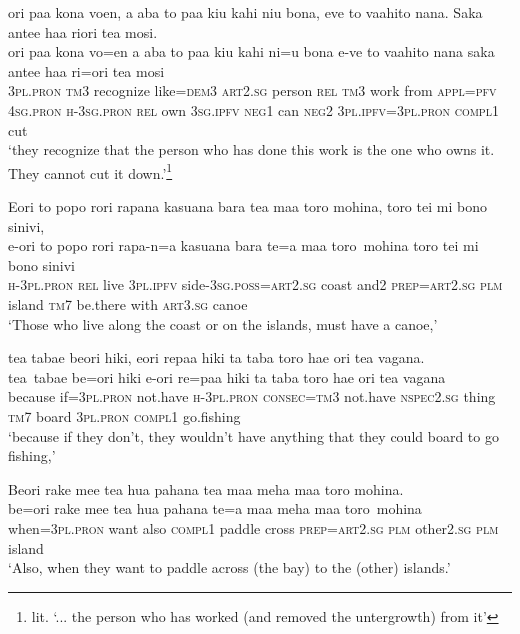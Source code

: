 \ea\label{ex:text3-10}
ori paa kona voen, a aba to paa kiu kahi niu bona, eve to vaahito nana. Saka antee haa riori tea mosi.\\
\gll ori	paa	kona	vo=en	a	aba	to	paa	kiu	kahi	ni=u	bona	e-ve	to	vaahito	nana	saka	antee	haa	ri=ori	tea	mosi\\
     3\textsc{pl}.\textsc{pron}	\textsc{tm}3	recognize	like=\textsc{dem}3	\textsc{art}2.\textsc{sg}	person	\textsc{rel}	\textsc{tm}3	work	from	\textsc{appl}=\textsc{pfv}	4\textsc{sg}.\textsc{pron}	\textsc{h}-3\textsc{sg}.\textsc{pron}	\textsc{rel}	own	3\textsc{sg}.\textsc{ipfv}	\textsc{neg}1	can	\textsc{neg}2	3\textsc{pl}.\textsc{ipfv}=3\textsc{pl}.\textsc{pron}	\textsc{compl}1	cut\\
\glt `they recognize that the person who has done this work is the one who owns it. They cannot cut it down.'\footnote{lit. `... the person who has worked  (and removed the untergrowth) from it'}
\z

\ea\label{ex:text3-11}
Eori to popo rori rapana kasuana bara tea maa toro mohina, toro tei mi bono sinivi,\\
\gll e-ori	to	popo	rori	rapa-n=a	kasuana	bara	te=a	maa	toro~mohina	toro	tei	mi	bono	sinivi\\
     \textsc{h}-3\textsc{pl}.\textsc{pron}	\textsc{rel}	live	3\textsc{pl}.\textsc{ipfv}	side-3\textsc{sg}.\textsc{poss}=\textsc{art}2.\textsc{sg}	coast	and2	\textsc{prep}=\textsc{art}2.\textsc{sg}	\textsc{plm}	island	\textsc{tm}7	be.there	with	\textsc{art}3.\textsc{sg}	canoe\\
\glt `Those who live along the coast or on the islands, must have a canoe,'
\z

\ea\label{ex:text3-12}
tea tabae beori hiki, eori repaa hiki ta taba toro hae ori tea vagana.\\
\gll tea~tabae	be=ori	hiki	e-ori	re=paa	hiki	ta	taba	toro	hae	ori	tea	vagana\\
     because	if=3\textsc{pl}.\textsc{pron}	not.have	\textsc{h}-3\textsc{pl}.\textsc{pron}	\textsc{consec}=\textsc{tm}3	not.have	\textsc{nspec}2.\textsc{sg}	thing	\textsc{tm}7	board	3\textsc{pl}.\textsc{pron}	\textsc{compl}1	go.fishing\\
\glt `because if they don't, they wouldn't have anything that they could board to go fishing,'
\z

\ea\label{ex:text3-13}
Beori rake mee tea hua pahana tea maa meha maa toro mohina.\\
\gll be=ori	rake	mee	tea	hua	pahana	te=a	maa	meha	maa	toro~mohina\\
     when=3\textsc{pl}.\textsc{pron}	want	also	\textsc{compl}1	paddle	cross	\textsc{prep}=\textsc{art}2.\textsc{sg}	\textsc{plm}	other2.\textsc{sg}	\textsc{plm}	island\\
\glt `Also, when they want to paddle across (the bay) to the (other) islands.'
\z

